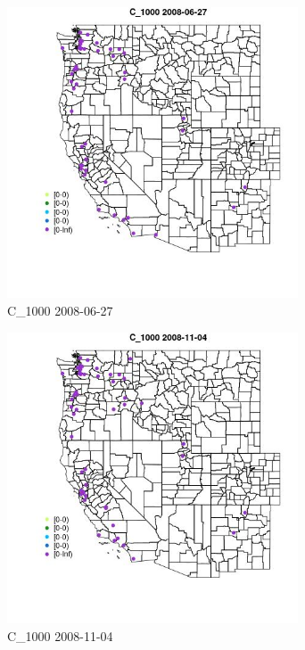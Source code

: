 \begin{figure} 
\centering  
\includegraphics[width=0.77\textwidth]{Code_Outputs/Report_ML_input_PM25_Step4_part_e_de_duplicated_aves_MapObsC_10002008-06-27.jpg} 
\caption{\label{fig:Report_ML_input_PM25_Step4_part_e_de_duplicated_avesMapObsC_10002008-06-27}C_1000 2008-06-27} 
\end{figure} 
 

\clearpage 

\begin{figure} 
\centering  
\includegraphics[width=0.77\textwidth]{Code_Outputs/Report_ML_input_PM25_Step4_part_e_de_duplicated_aves_MapObsC_10002008-11-04.jpg} 
\caption{\label{fig:Report_ML_input_PM25_Step4_part_e_de_duplicated_avesMapObsC_10002008-11-04}C_1000 2008-11-04} 
\end{figure} 
 

